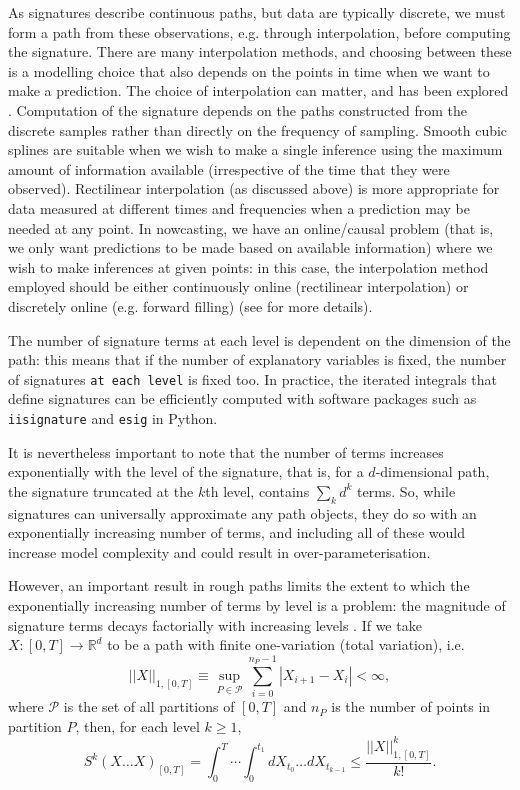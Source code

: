 \documentclass[a4paper, 12pt]{article}
\theoremstyle{remark}
\begin{document}
As signatures describe continuous paths, but data are typically discrete, we must form a path from these observations, e.g. through interpolation, before computing the signature. There are many interpolation methods, and choosing between these is a modelling choice that also depends on the points in time when we want to make a prediction. The choice of interpolation can matter, and has been explored \citep{morrill2022onthe, walker2026faithful}. Computation of the signature depends on the paths constructed from the discrete samples rather than directly on the frequency of sampling. Smooth cubic splines are suitable when we wish to make a single inference using the maximum amount of information available (irrespective of the time that they were observed). Rectilinear interpolation (as discussed above) is more appropriate for data measured at different times and frequencies when a prediction may be needed at any point. In nowcasting, we have an online/causal problem (that is, we only want predictions to be made based on available information) where we wish to make inferences at given points: in this case, the interpolation method employed should be either continuously online (rectilinear interpolation) or discretely online (e.g. forward filling) (see \cite{morrill2022onthe} for more details).

The number of signature terms at each level is dependent on the dimension of the path: this means that if the number of explanatory variables is fixed, the number of signatures \texttt{at each level} is fixed too.
In practice, the iterated integrals that define signatures can be efficiently computed with software packages such as \texttt{iisignature} \citep{iisignature} and \texttt{esig} in Python.

It is nevertheless important to note that the number of terms increases exponentially with the level of the signature, that is, for a $d$-dimensional path, the signature truncated at the $k$th level, contains \(\sum_k d^k\) terms. So, while signatures can universally approximate any path objects, they do so with an exponentially increasing number of terms, and including all of these would increase model complexity and could result in over-parameterisation. 

However, an important result in rough paths limits the extent to which the exponentially increasing number of terms by level is a problem: the magnitude of signature terms decays factorially with increasing levels \citep{lyons2007differential}. If we take \(X:[0,T] \to \mathbb{R}^d\) to be a path with finite one-variation (total variation), i.e. 
\[||X||_{1,[0,T]} \equiv \sup_{P \in \mathcal{P}} \sum_{i=0}^{n_P-1} |X_{i+1} - X_i| <\infty,\]
where \(\mathcal{P}\) is the set of all partitions of \([0,T]\) and \(n_P\) is the number of points in partition \(P\), then, for each level \(k \geq 1\), 
\begin{equation}\label{eqn:sig_magnitude}
    S^k(X\dots X)_{[0,T]} = \int_0^{T}\cdots\int_0^{t_{1}} dX_{t_0}  \dots dX_{t_{k-1}} \leq \frac{||X||^k_{1,[0,T]}}{k!}.
\end{equation}
\end{document}
